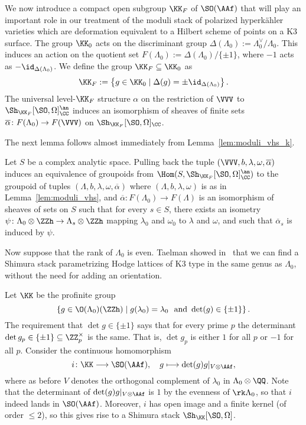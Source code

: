 We now introduce a compact open subgroup $\KK_F$ of $\SO(\AAf)$ that will play an important role in our treatment of the moduli stack of polarized hyperk\"ahler varieties which are deformation equivalent to a Hilbert scheme of points on a K3 surface. The group $\KK_0$ acts on the discriminant group $\Delta(\Lambda_0) := \Lambda_0^{\vee}/\Lambda_0$. This induces an action on the quotient set $F(\Lambda_0) := \Delta(\Lambda_0)/\{\pm 1\}$, where $-1$ acts as $-\id_{\Delta(\Lambda_0)}$. We define the group $\KK_F \subseteq \KK_0$ as
$$
\KK_F := \left\{g \in \KK_0 \mid \Delta(g) = \pm \id_{\Delta(\Lambda_0)}\right\}.
$$
The universal level-$\KK_F$ structure $\alpha$ on the restriction of $\VVV$ to $\Sh_{\KK_F}[\SO,\Omega]_{\CC}^{\an}$ induces an isomorphism of sheaves of finite sets $\overline{\alpha}\colon F(\Lambda_0) \rightarrow F(\VVV)$ on $\Sh_{\KK_F}[\SO,\Omega]_{\CC}$.

The next lemma follows almost immediately from Lemma~\ref{lem:moduli_vhs_k}.
\begin{lemma}\label{lem:moduli_vhs_k3n}
    Let $S$ be a complex analytic space. Pulling back the tuple $(\VVV,b,\lambda,\omega,\overline{\alpha})$ induces an equivalence of groupoids from $\Hom(S,\Sh_{\KK_F}[\SO,\Omega]_{\CC}^{\an})$ to the groupoid of tuples $(\Lambda,b,\lambda,\omega,\overline{\alpha})$ where $(\Lambda,b,\lambda,\omega)$ is as in Lemma~\ref{lem:moduli_vhs}, and $\overline{\alpha}\colon F(\Lambda_0) \rightarrow F(\Lambda)$ is an isomorphism of sheaves of sets on $S$ such that for every $s \in S$, there exists an isometry $\psi\colon \Lambda_0 \otimes \ZZh \rightarrow \Lambda_s \otimes \ZZh$ mapping $\lambda_0$ and $\omega_0$ to $\lambda$ and $\omega$, and such that $\overline{\alpha}_s$ is induced by $\psi$.
\end{lemma}

Now suppose that the rank of $\Lambda_0$ is even. Taelman showed in~\cite{TaelmanShimuraStacks} that we can find a Shimura stack parametrizing Hodge lattices of K3 type in the same genus as $\Lambda_0$, without the need for adding an orientation.

Let $\KK$ be the profinite group
\begin{equation}\label{eq:lennys_group}
\left\{ g \in \O(\Lambda_0)(\ZZh) \mid g(\lambda_0) = \lambda_0\ \text{ and } \det(g) \in \{\pm 1\} \right\}.
\end{equation}
The requirement that $\det g \in \{\pm 1\}$ says that for every prime $p$ the determinant $\det g_p \in \{\pm 1\} \subseteq \ZZ_p^{\times}$ is the same. That is, $\det g_p$ is either $1$ for all $p$ or $-1$ for all $p$. Consider the continuous homomorphism
$$
i\colon \KK \longrightarrow \SO(\AAf),\quad g\longmapsto \det(g) g|_{V \otimes \AAf},
$$
where as before $V$ denotes the orthogonal complement of $\lambda_0$ in $\Lambda_0 \otimes \QQ$. Note that the determinant of $\det(g) g|_{V \otimes \AAf}$ is $1$ by the evenness of $\rk \Lambda_0$, so that $i$ indeed lands in $\SO(\AAf)$. Moreover, $i$ has open image and a finite kernel (of order $\leq 2$), so this gives rise to a Shimura stack $\Sh_{\KK}[\SO,\Omega]$.

